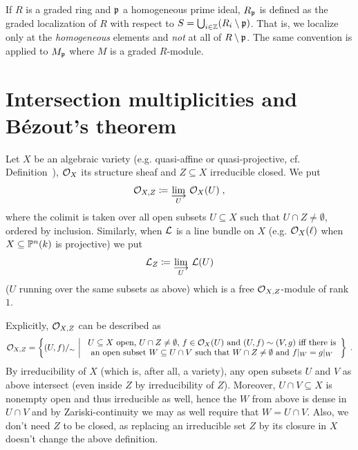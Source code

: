 \documentclass[a4paper,parskip=half,numbers=enddot, DIV=12]{scrreprt}
\begin{document}
\begin{rem}
    If $R$ is a graded ring and $\mathfrak{p}$ a homogeneous prime ideal, $R_{\mathfrak{p}}$ is defined as the graded localization of $R$ with respect to $S=\bigcup_{i\in\mathbb{Z}} (R_i\setminus \mathfrak{p})$. That is, we localize only at the \emph{homogeneous} elements and \emph{not} at all of $R\setminus\mathfrak{p}$. The same convention is applied to $M_{\mathfrak{p}}$ where $M$ is a graded $R$-module.
\end{rem}

\section{Intersection multiplicities and B\'ezout's theorem}


\begin{defi}
    Let $X$ be an algebraic variety (e.g. quasi-affine or quasi-projective, cf. Definition~), $\mathcal{O}_X$ its structure sheaf and $Z\subseteq X$ irreducible closed. We put 
    \begin{align*}
        \Oo_{X,Z}\coloneqq \colimit[U] \Oo_X(U)\;,
    \end{align*}
    where the colimit is taken over all open subsets $U\subseteq X$ such that $U\cap Z\neq\emptyset$, ordered by inclusion. Similarly, when $\mathcal{L}$ is a line bundle on $X$ (e.g. $\mathcal{O}_X(\ell)$ when $X\subseteq \mathbb{P}^n(k)$ is projective) we put
    \begin{align*}
    \Ll_Z\coloneqq\colimit[U] \Ll(U)
    \end{align*}
    ($U$ running over the same subsets as above) which is a free $\mathcal{O}_{X,Z}$-module of rank $1$.
\end{defi}
    
    Explicitly, $\mathcal{O}_{X,Z}$ can be described as
    \begin{align*}
    	\mathcal{O}_{X,Z}=\left\{(U,f)/_\sim\ \middle|\ 
    	\begin{array}{c}
    	U\subseteq X\text{ open, }U\cap Z\neq\emptyset\text{, }f\in\mathcal{O}_X(U)\text{ and }(U,f)\sim (V,g)\text{ iff there is}\\
    	\text{an open subset }W\subseteq U\cap V\text{ such that }W\cap Z\neq\emptyset\text{ and }f|_W=g|_W
    	\end{array}
    	\right\}\;.
    \end{align*}
    By  irreducibility of $X$ (which is, after all, a variety), any open subsets $U$ and $V$ as above intersect (even inside $Z$ by irreducibility of $Z$). Moreover, $U\cap V\subseteq X$ is nonempty open and thus irreducible as well, hence the $W$ from above is dense in $U\cap V$ and by Zariski-continuity we may as well require that $W=U\cap V$. Also, we don't need $Z$ to be closed, as replacing an irreducible set $Z$ by its closure in $X$ doesn't change the above definition.
    
\end{document}

